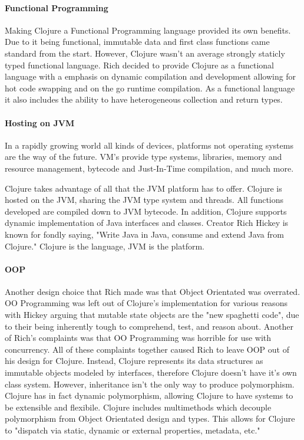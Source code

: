     \paragraph{Functional Programming}
    Making Clojure a Functional Programming language provided its own benefits. Due to it being functional, immutable data and first class functions came standard from the start. However, Clojure wasn't an average strongly staticly typed functional language. Rich decided to provide Clojure as a functional language with a emphasis on dynamic compilation and development allowing for hot code swapping and on the go runtime compilation. As a functional language it also includes the ability to have heterogeneous collection and return types. 
    
    \paragraph{Hosting on JVM}
    In a rapidly growing world all kinds of devices, platforms not operating systems are the way of the future. VM's  provide type systems, libraries, memory and resource management, bytecode and Just-In-Time compilation, and much more.
    
    Clojure takes advantage of all that the JVM platform has to offer. Clojure is hosted on the JVM, sharing the JVM type system and threads. All functions developed are compiled down to JVM bytecode. In addition, Clojure supports dynamic implementation of Java interfaces and classes. Creator Rich Hickey is known for fondly saying, "Write Java in Java, consume and extend Java from Clojure." Clojure is the language, JVM is the platform. \cite{JVMHostedLanguages_DependencyOnJava_JournalArticle_Li}
    
    \paragraph{OOP}
    Another design choice that Rich made was that Object Orientated was overrated. OO Programming was left out of Clojure's implementation for various reasons with Hickey arguing that mutable state objects are the "new spaghetti code", due to their being inherently tough to comprehend, test, and reason about. Another of Rich's complaints was that OO Programming was horrible for use with concurrency. All of these complaints together caused Rich to leave OOP out of his design for Clojure. 
    Instead, Clojure represents its data structures as immutable objects modeled by interfaces, therefore Clojure doesn't have it's own class system. However, inheritance isn't the only way to produce polymorphism. Clojure has in fact dynamic polymorphism, allowing Clojure to have systems to be extensible and flexibile. Clojure includes multimethods which decouple polymorphism from Object Orientated design and types. This allows for Clojure to "dispatch via static, dynamic or external properties, metadata, etc." 
    \cite{ClojureConcurrencySupport_Slides_Hickey}
      
